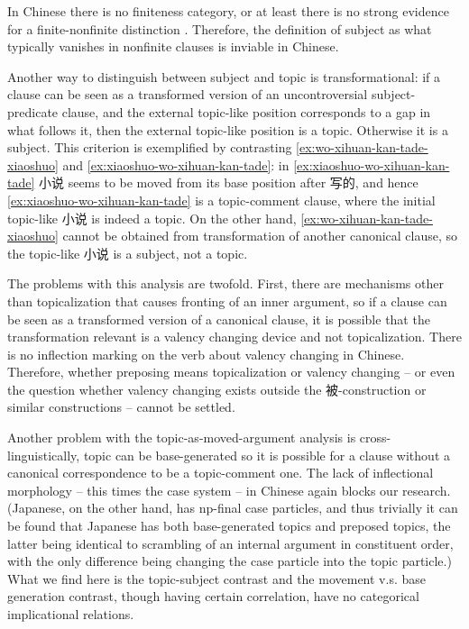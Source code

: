 \documentclass[UTF8, a4paper, oneside, scheme=plain]{ctexart}
\begin{document}
In Chinese there is no finiteness category,
or at least there is no strong evidence for a finite-nonfinite distinction \citep{no-finite}.
Therefore, the definition of subject as 
what typically vanishes in nonfinite clauses 
is inviable in Chinese.

Another way to distinguish between subject and topic 
is transformational:
if a clause can be seen as a transformed version of an uncontroversial subject-predicate clause,
and the external topic-like position corresponds to a gap in what follows it,
then the external topic-like position is a topic.
Otherwise it is a subject.
This criterion is exemplified by contrasting 
\eqref{ex:wo-xihuan-kan-tade-xiaoshuo} and \eqref{ex:xiaoshuo-wo-xihuan-kan-tade}:
in \eqref{ex:xiaoshuo-wo-xihuan-kan-tade} 小说 seems to be moved from its base position after 写的,
and hence \eqref{ex:xiaoshuo-wo-xihuan-kan-tade} is a topic-comment clause,
where the initial topic-like 小说 is indeed a topic.
On the other hand, \eqref{ex:wo-xihuan-kan-tade-xiaoshuo} cannot be obtained 
from transformation of another canonical clause,
so the topic-like 小说 is a subject, not a topic.

The problems with this analysis are twofold.
First, there are mechanisms other than topicalization 
that causes fronting of an inner argument,
so if a clause can be seen as a transformed version of a canonical clause,
it is possible that the transformation relevant is a valency changing device and not topicalization.
There is no inflection marking on the verb about valency changing in Chinese.
Therefore, whether preposing means topicalization or valency changing
-- or even the question whether valency changing exists outside the 被-construction or similar constructions --
cannot be settled.

Another problem with the topic-as-moved-argument analysis is cross-linguistically,
topic can be base-generated 
so it is possible for a clause without a canonical correspondence 
to be a topic-comment one.
The lack of inflectional morphology -- this times the case system -- in Chinese
again blocks our research.
(Japanese, on the other hand, has \ac{np}-final case particles,
and thus trivially it can be found that 
Japanese has both base-generated topics and preposed topics,
the latter being identical to scrambling of an internal argument in constituent order,
with the only difference being changing the case particle into the topic particle.) 
What we find here is the topic-subject contrast 
and the movement v.s. base generation contrast,
though having certain correlation,
have no categorical implicational relations.
\end{document}
